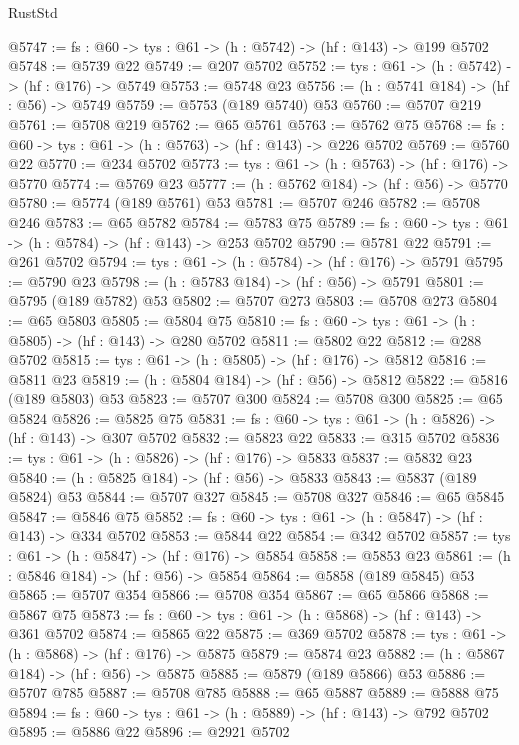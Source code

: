 \begin{lexlean}{RustStd}
\begin{coremodule}
@5747 := {fs : @60} -> {tys : @61} -> (h : @5742) -> (hf : @143) -> @199 @5702
@5748 := @5739 @22
@5749 := @207 @5702
@5752 := {tys : @61} -> (h : @5742) -> (hf : @176) -> @5749
@5753 := @5748 @23
@5756 := (h : @5741 @184) -> (hf : @56) -> @5749
@5759 := @5753 (@189 @5740) @53
@5760 := @5707 @219
@5761 := @5708 @219
@5762 := @65 @5761
@5763 := @5762 @75
@5768 := {fs : @60} -> {tys : @61} -> (h : @5763) -> (hf : @143) -> @226 @5702
@5769 := @5760 @22
@5770 := @234 @5702
@5773 := {tys : @61} -> (h : @5763) -> (hf : @176) -> @5770
@5774 := @5769 @23
@5777 := (h : @5762 @184) -> (hf : @56) -> @5770
@5780 := @5774 (@189 @5761) @53
@5781 := @5707 @246
@5782 := @5708 @246
@5783 := @65 @5782
@5784 := @5783 @75
@5789 := {fs : @60} -> {tys : @61} -> (h : @5784) -> (hf : @143) -> @253 @5702
@5790 := @5781 @22
@5791 := @261 @5702
@5794 := {tys : @61} -> (h : @5784) -> (hf : @176) -> @5791
@5795 := @5790 @23
@5798 := (h : @5783 @184) -> (hf : @56) -> @5791
@5801 := @5795 (@189 @5782) @53
@5802 := @5707 @273
@5803 := @5708 @273
@5804 := @65 @5803
@5805 := @5804 @75
@5810 := {fs : @60} -> {tys : @61} -> (h : @5805) -> (hf : @143) -> @280 @5702
@5811 := @5802 @22
@5812 := @288 @5702
@5815 := {tys : @61} -> (h : @5805) -> (hf : @176) -> @5812
@5816 := @5811 @23
@5819 := (h : @5804 @184) -> (hf : @56) -> @5812
@5822 := @5816 (@189 @5803) @53
@5823 := @5707 @300
@5824 := @5708 @300
@5825 := @65 @5824
@5826 := @5825 @75
@5831 := {fs : @60} -> {tys : @61} -> (h : @5826) -> (hf : @143) -> @307 @5702
@5832 := @5823 @22
@5833 := @315 @5702
@5836 := {tys : @61} -> (h : @5826) -> (hf : @176) -> @5833
@5837 := @5832 @23
@5840 := (h : @5825 @184) -> (hf : @56) -> @5833
@5843 := @5837 (@189 @5824) @53
@5844 := @5707 @327
@5845 := @5708 @327
@5846 := @65 @5845
@5847 := @5846 @75
@5852 := {fs : @60} -> {tys : @61} -> (h : @5847) -> (hf : @143) -> @334 @5702
@5853 := @5844 @22
@5854 := @342 @5702
@5857 := {tys : @61} -> (h : @5847) -> (hf : @176) -> @5854
@5858 := @5853 @23
@5861 := (h : @5846 @184) -> (hf : @56) -> @5854
@5864 := @5858 (@189 @5845) @53
@5865 := @5707 @354
@5866 := @5708 @354
@5867 := @65 @5866
@5868 := @5867 @75
@5873 := {fs : @60} -> {tys : @61} -> (h : @5868) -> (hf : @143) -> @361 @5702
@5874 := @5865 @22
@5875 := @369 @5702
@5878 := {tys : @61} -> (h : @5868) -> (hf : @176) -> @5875
@5879 := @5874 @23
@5882 := (h : @5867 @184) -> (hf : @56) -> @5875
@5885 := @5879 (@189 @5866) @53
@5886 := @5707 @785
@5887 := @5708 @785
@5888 := @65 @5887
@5889 := @5888 @75
@5894 := {fs : @60} -> {tys : @61} -> (h : @5889) -> (hf : @143) -> @792 @5702
@5895 := @5886 @22
@5896 := @2921 @5702

\end{coremodule}
\end{lexlean}
